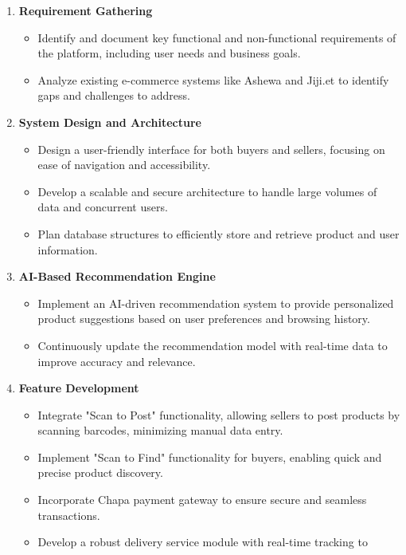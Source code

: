 \documentclass[12pt]{report}
\begin{document}
\begin{enumerate}
	\item \textbf{Requirement Gathering}
	      \begin{itemize}
		      \item Identify and document key functional and non-functional requirements
		            of the platform, including user needs and business goals.
		      \item Analyze existing e-commerce systems like Ashewa and Jiji.et to
		            identify gaps and challenges to address.
	      \end{itemize}
	\item \textbf{System Design and Architecture}
	      \begin{itemize}
		      \item Design a user-friendly interface for both buyers and sellers, focusing
		            on ease of navigation and accessibility.
		      \item Develop a scalable and secure architecture to handle large volumes of
		            data and concurrent users.
		      \item Plan database structures to efficiently store and retrieve product and
		            user information.
	      \end{itemize}
	\item \textbf{AI-Based Recommendation Engine}
	      \begin{itemize}
		      \item Implement an AI-driven recommendation system to provide
		            personalized product suggestions based on user preferences and
		            browsing history.
		      \item Continuously update the recommendation model with real-time data to
		            improve accuracy and relevance.
	      \end{itemize}
	\item \textbf{Feature Development}
	      \begin{itemize}
		      \item Integrate "Scan to Post" functionality, allowing sellers to post products
		            by scanning barcodes, minimizing manual data entry.
		      \item Implement "Scan to Find" functionality for buyers, enabling quick and
		            precise product discovery.
		      \item Incorporate Chapa payment gateway to ensure secure and seamless
		            transactions.
		      \item Develop a robust delivery service module with real-time tracking to

\end{itemize}
\end{enumerate}
\end{document}
